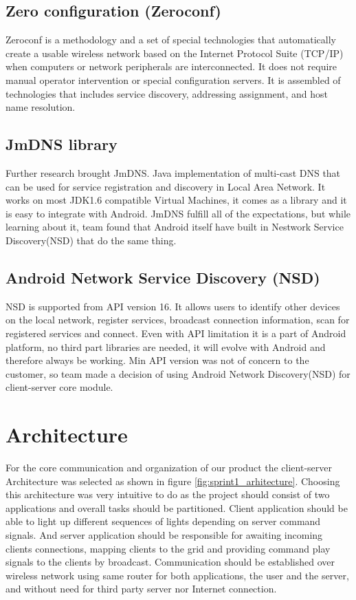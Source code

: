 \subsection {Zero configuration (Zeroconf)}
Zeroconf is a methodology and a set of special technologies that automatically create a usable wireless network based on the Internet Protocol Suite (TCP/IP) when computers or network peripherals are interconnected. 
It does not require manual operator intervention or special configuration servers.
It is assembled of technologies that includes service discovery, addressing assignment, and host name resolution.


\subsection{JmDNS library}
Further research brought JmDNS. 
Java implementation of multi-cast DNS that can be used for service registration and discovery in Local Area Network. 
It works on most JDK1.6 compatible Virtual Machines, it comes as a library and it is easy to integrate with Android. 
JmDNS fulfill all of the expectations, but while learning about it, team found that Android itself have built in Nestwork Service Discovery(NSD) that do the same thing.

\subsection{Android Network Service Discovery (NSD)}
NSD is supported from API version 16. 
It allows users to identify other devices on the local network, register services, broadcast connection information, scan for registered services and connect.
Even with API limitation it is a part of Android platform, no third part libraries are needed, it will evolve with Android and therefore always be working.
Min API version was not of concern to the customer, so team made a decision of using Android Network Discovery(NSD) for client-server core module.

\section{Architecture}
For the core communication and organization of our product the client-server Architecture was selected as shown in figure \ref{fig:sprint1_arhitecture}.
Choosing this architecture was very intuitive to do as the project should consist of two applications and overall tasks should be partitioned. 
Client application should be able to light up different sequences of lights depending on server command signals.
And server application should be responsible for awaiting incoming clients connections, mapping clients to the grid and providing command play signals to the clients by broadcast.
Communication should be established over wireless network using same router for both applications, the user and the server, and without need for third party server nor Internet connection. 

